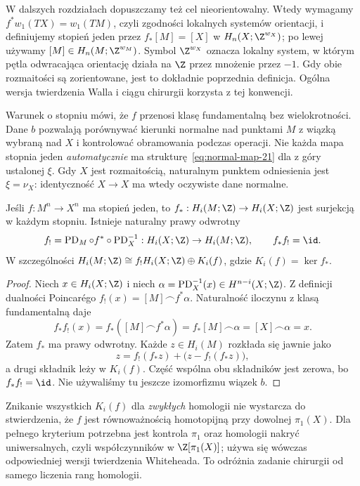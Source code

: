 W dalszych rozdziałach dopuszczamy też cel
nieorientowalny. Wtedy wymagamy
$f^*w_1(TX)=w_1(TM)$, czyli zgodności
lokalnych systemów orientacji, i definiujemy
stopień jeden przez
$f_*[M]=[X]$ w
$H_n(X;\Z^{w_X})$; po lewej używamy
$[M]\in H_n(M;\Z^{w_M})$.
Symbol $\Z^{w_X}$ oznacza lokalny system,
w którym pętla odwracająca orientację
działa na $\Z$ przez mnożenie przez $-1$.
Gdy obie rozmaitości są zorientowane,
jest to dokładnie poprzednia definicja.
Ogólna wersja twierdzenia Walla i ciągu
chirurgii korzysta z tej konwencji.

Warunek o stopniu mówi, że $f$ przenosi klasę
fundamentalną bez wielokrotności. Dane $b$ pozwalają
porównywać kierunki normalne nad punktami $M$
z wiązką wybraną nad $X$ i kontrolować obramowania
podczas operacji. Nie każda mapa stopnia jeden
\emph{automatycznie} ma strukturę~\eqref{eq:normal-map-21}
dla z góry ustalonej $\xi$. Gdy $X$ jest
rozmaitością, naturalnym punktem odniesienia jest
$\xi=\nu_X$: identyczność $X\to X$ ma wtedy
oczywiste dane normalne.

\begin{lemat}
\label{lem:split-normalne-21}
Jeśli $f:M^n\to X^n$ ma stopień jeden, to
$f_*:H_i(M;\Z)\to H_i(X;\Z)$ jest surjekcją
w każdym stopniu. Istnieje naturalny prawy odwrotny
\[
 f_!=\operatorname{PD}_M\circ f^*
       \circ\operatorname{PD}_X^{-1}:H_i(X;\Z)\to H_i(M;\Z),
 \qquad f_*f_!=\id.
\]
W szczególności
$H_i(M;\Z)\cong f_!H_i(X;\Z)\oplus K_i(f)$,
gdzie $K_i(f)=\ker f_*$.
\end{lemat}
\begin{proof}
Niech $x\in H_i(X;\Z)$ i niech
$\alpha=\operatorname{PD}_X^{-1}(x)
\in H^{n-i}(X;\Z)$.
Z definicji dualności Poincarégo
$f_!(x)=[M]\frown f^*\alpha$.
Naturalność iloczynu z klasą fundamentalną daje
\[
 f_*f_!(x)
 =f_*([M]\frown f^*\alpha)
 =f_*[M]\frown\alpha
 =[X]\frown\alpha=x.
\]
Zatem $f_*$ ma prawy odwrotny. Każde
$z\in H_i(M)$ rozkłada się jawnie jako
\[
 z=f_!(f_*z)+\bigl(z-f_!(f_*z)\bigr),
\]
a drugi składnik leży w $K_i(f)$.
Część wspólna obu składników jest zerowa,
bo $f_*f_!=\id$. Nie używaliśmy tu jeszcze
izomorfizmu wiązek $b$.
\end{proof}

\begin{uwaga}
Znikanie wszystkich $K_i(f)$ dla \emph{zwykłych}
homologii nie wystarcza do stwierdzenia, że $f$
jest równoważnością homotopijną przy dowolnej
$\pi_1(X)$. Dla pełnego kryterium potrzebna
jest kontrola $\pi_1$ oraz homologii nakryć
uniwersalnych, czyli współczynników w
$\Z[\pi_1(X)]$; używa się wówczas odpowiedniej
wersji twierdzenia Whiteheada. To odróżnia
zadanie chirurgii od samego liczenia rang homologii.
\end{uwaga}

